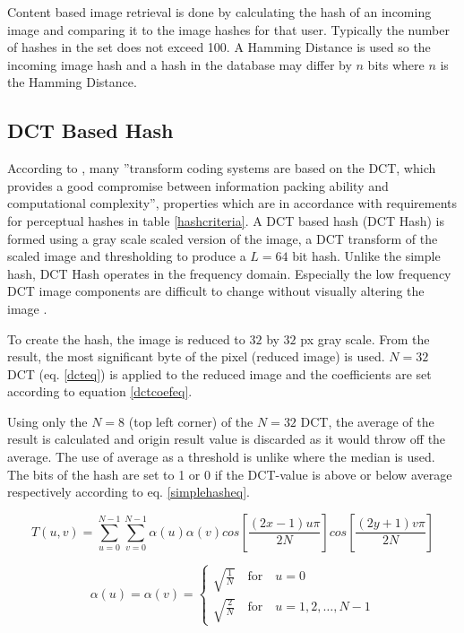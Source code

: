 \documentclass[english,12pt,a4paper,pdftex,elec,utf8, table]{aaltothesis}
\begin{document}
Content based image retrieval is done by calculating the hash of an incoming image and comparing it to the image hashes for that user. Typically the number of hashes in the set does not exceed 100. A Hamming Distance is used so the incoming image hash and a hash in the database may differ by $n$ bits where $n$ is the Hamming Distance.

\subsection{DCT Based Hash}
According to \cite{Gonzalez2002}, many ''transform coding systems are based on the DCT, which provides a good compromise between information packing ability and computational complexity'', properties which are in accordance with requirements for perceptual hashes in table \ref{hashcriteria}. A DCT based hash (DCT Hash) is formed using a gray scale scaled version of the image, a DCT transform of the scaled image and thresholding to produce a $L=64$ bit hash. Unlike the simple hash, DCT Hash operates in the frequency domain. Especially the low frequency DCT image components are difficult to change without visually altering the image \cite{Fridrich1999}.

To create the hash, the image is reduced to $32$ by $32$ px gray scale. From the result, the most significant byte of the pixel (reduced image) is used. $N=32$ DCT (eq. \ref{dcteq}) is applied to the reduced image and the coefficients are set according to equation \ref{dctcoefeq}.

Using only the $N=8$ (top left corner) of the $N=32$ DCT, the average of the result is calculated and origin result value is discarded as it would throw off the average. The use of average as a threshold is unlike \cite{Coskun2004} where the median is used. The bits of the hash are set to 1 or 0 if the DCT-value is above or below average respectively according to eq. \ref{simplehasheq}.

\begin{equation}\label{dcteq}
T(u,v)= \sum_{u=0}^{N-1} \sum_{v=0}^{N-1}\alpha(u)\alpha(v)cos\left[\frac{(2x-1)u\pi}{2N}\right]cos\left[\frac{(2y + 1)v\pi}{2N}\right]
\end{equation}

\begin{equation}\label{dctcoefeq}
  \alpha(u) = \alpha(v)= \begin{cases}
    \sqrt{\frac{1}{N}} \quad \textrm{for} \quad u=0\\
    \sqrt{\frac{2}{N}} \quad \textrm{for} \quad u=1,2,\ldots,N-1
    \end{cases}
\end{equation}
\end{document}
